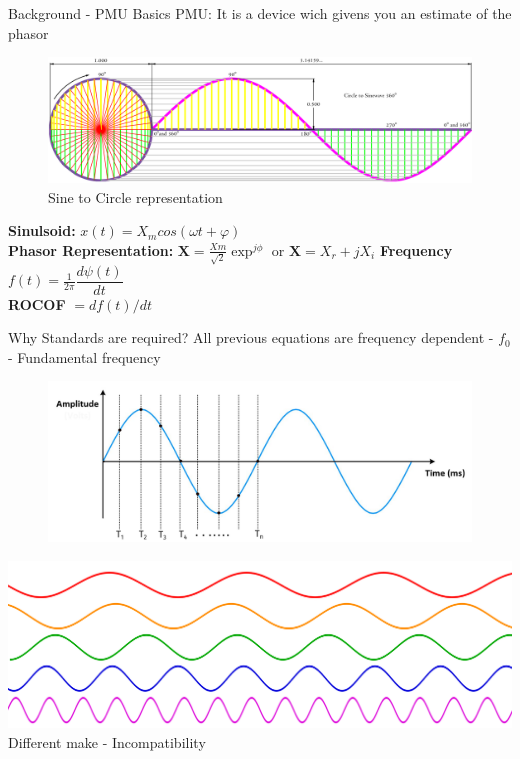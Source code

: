 \documentclass{beamer}
\begin{document}
   \begin{frame}{Background - PMU Basics}
   PMU: It is a device wich givens you an estimate of the phasor 
   \begin{figure}
   \includegraphics*[scale = 0.2]{Circle-To-Sine-Wave.png}
   \caption{Sine to Circle representation \cite{site:westau}}
   \end{figure}

   \textbf{Sinulsoid:} \textbf{$x(t) = X_m cos(\omega t + \varphi)$} \\
	\textbf{Phasor Representation:} $\textbf{X} = \frac{Xm}{\sqrt{2}}\exp^{j\phi} $ or $\textbf{X} = X_r+jX_i$
	\textbf{Frequency} $f(t) = \frac{1}{2\pi} \dfrac{d\psi(t)}{dt}$\\
	\textbf{ROCOF} $= df(t)/dt$
   
   \end{frame}

\begin{frame}{Why Standards are required?}
\centering
All previous equations are frequency dependent - $f_0$ - Fundamental frequency
\begin{figure}
\includegraphics[scale=0.2]{sine_sampled.png} \\
\end{figure}
\pause
\includegraphics[scale=0.1]{multisine.png}\\
Different make - Incompatibility 
\end{frame}
   
\end{document}
